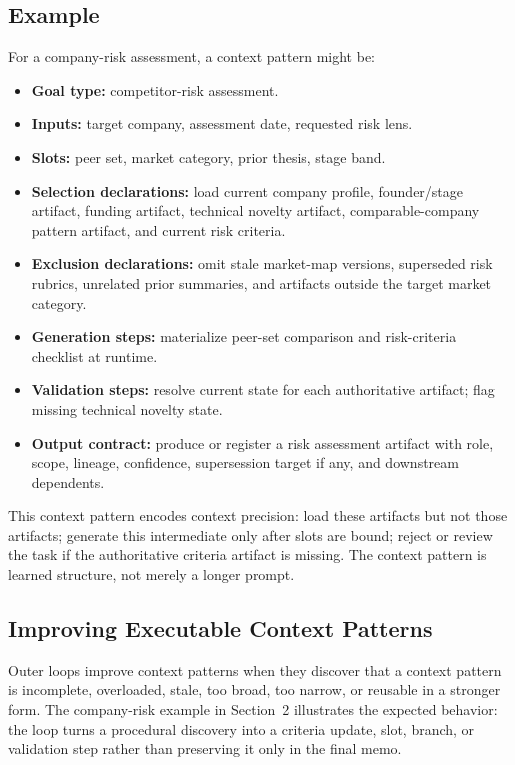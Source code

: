 \documentclass{article}
\begin{document}
\subsection{Example}

For a company-risk assessment, a context pattern might be:
\begin{itemize}[leftmargin=*]
\item \textbf{Goal type:} competitor-risk assessment.
\item \textbf{Inputs:} target company, assessment date, requested risk lens.
\item \textbf{Slots:} peer set, market category, prior thesis, stage band.
\item \textbf{Selection declarations:} load current company profile, founder/stage artifact, funding artifact, technical novelty artifact, comparable-company pattern artifact, and current risk criteria.
\item \textbf{Exclusion declarations:} omit stale market-map versions, superseded risk rubrics, unrelated prior summaries, and artifacts outside the target market category.
\item \textbf{Generation steps:} materialize peer-set comparison and risk-criteria checklist at runtime.
\item \textbf{Validation steps:} resolve current state for each authoritative artifact; flag missing technical novelty state.
\item \textbf{Output contract:} produce or register a risk assessment artifact with role, scope, lineage, confidence, supersession target if any, and downstream dependents.
\end{itemize}

This context pattern encodes context precision: load these artifacts but not those artifacts; generate this intermediate only after slots are bound; reject or review the task if the authoritative criteria artifact is missing. The context pattern is learned structure, not merely a longer prompt.

\subsection{Improving Executable Context Patterns}

Outer loops improve context patterns when they discover that a context pattern is incomplete, overloaded, stale, too broad, too narrow, or reusable in a stronger form. The company-risk example in Section~2 illustrates the expected behavior: the loop turns a procedural discovery into a criteria update, slot, branch, or validation step rather than preserving it only in the final memo.
\end{document}
